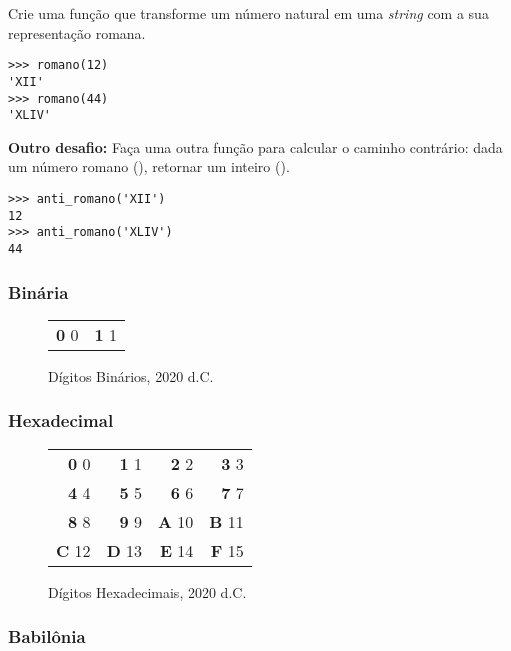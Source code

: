 \documentclass[12pt]{article}
\begin{document}
	\quest Crie uma função que transforme um número natural em uma \textit{string} com a sua representação romana.
	
	\begin{lstlisting}
>>> romano(12)
'XII'
>>> romano(44)
'XLIV'
	\end{lstlisting}

	\textbf{Outro desafio:} Faça uma outra função para calcular o caminho contrário: dada um número romano (), retornar um inteiro ().

	\begin{lstlisting}
>>> anti_romano('XII')
12
>>> anti_romano('XLIV')
44
	\end{lstlisting}
	

	\subsubsection*{Binária}
	
	\begin{figure}[H]
	\centering
	\begin{tabular}{rr}
	\textbf{0} \phantom{0}0 & \textbf{1} \phantom{0}1
	\end{tabular}
	\caption{Dígitos Binários, 2020 d.C.}
	\end{figure}
	
	\subsubsection*{Hexadecimal}
	
	\begin{figure}[H]
	\centering
	\begin{tabular}{rrrr}
	\textbf{0} \phantom{1}0 & \textbf{1} \phantom{1}1 & \textbf{2} \phantom{1}2 & \textbf{3} \phantom{1}3\\
	\textbf{4} \phantom{1}4 & \textbf{5} \phantom{1}5 & \textbf{6} \phantom{1}6 & \textbf{7} \phantom{1}7\\
	\textbf{8} \phantom{1}8 & \textbf{9} \phantom{1}9 & \textbf{A} 10 & \textbf{B} 11\\
	\textbf{C} 12 & \textbf{D} 13 & \textbf{E} 14 & \textbf{F} 15
	\end{tabular}
	\caption{Dígitos Hexadecimais, 2020 d.C.}
	\end{figure}
			
	
	\subsubsection*{Babilônia}
	
\end{document}
